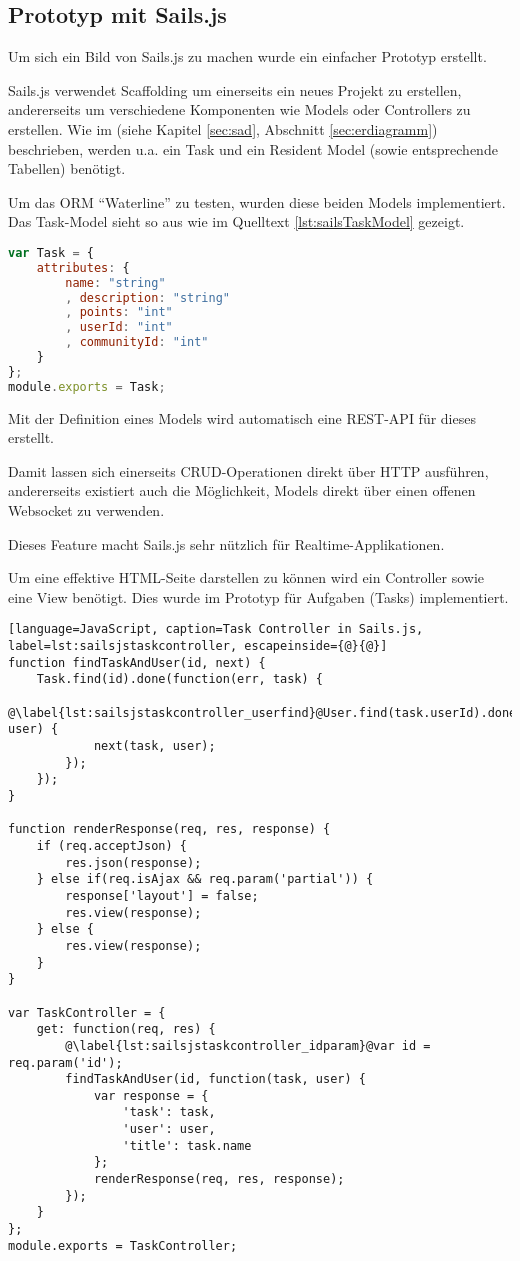 \subsection{Prototyp mit Sails.js}
Um sich ein Bild von Sails.js zu machen wurde ein einfacher Prototyp \cite{SailsPrototyp} erstellt.

Sails.js verwendet \gls{Scaffolding} um einerseits ein neues Projekt zu erstellen, andererseits  um verschiedene Komponenten wie Models oder Controllers zu erstellen. Wie im  (siehe Kapitel \ref{sec:sad}, Abschnitt \ref{sec:erdiagramm}) beschrieben, werden u.a. ein Task und ein Resident Model (sowie entsprechende Tabellen) benötigt.

Um das \gls{ORM} ``Waterline'' \cite{Waterline} zu testen, wurden diese beiden Models implementiert. Das Task-Model sieht so aus wie im Quelltext \ref{lst:sailsTaskModel} gezeigt.

\begin{lstlisting}[language=JavaScript, caption=Task Model in Sails.js, label=lst:sailsTaskModel]
var Task = {
	attributes: {
		name: "string"
		, description: "string"
		, points: "int"
		, userId: "int"
		, communityId: "int"
	}
};
module.exports = Task;
\end{lstlisting}

Mit der Definition eines Models wird automatisch eine \gls{REST}-API für dieses erstellt.

Damit lassen sich einerseits CRUD-Operationen direkt über HTTP ausführen, andererseits existiert auch die Möglichkeit, Models direkt über einen offenen \gls{Websocket} zu verwenden.

Dieses Feature macht Sails.js sehr nützlich für \gls{Realtime}-Applikationen.

Um eine effektive HTML-Seite darstellen zu können wird ein Controller sowie eine View benötigt. Dies wurde im Prototyp für Aufgaben (Tasks) implementiert.

\newpage
\begin{lstlisting}[language=JavaScript, caption=Task Controller in Sails.js, label=lst:sailsjstaskcontroller, escapeinside={@}{@}]
function findTaskAndUser(id, next) {
	Task.find(id).done(function(err, task) {
		@\label{lst:sailsjstaskcontroller_userfind}@User.find(task.userId).done(function(err, user) {
			next(task, user);
		});
	});
}

function renderResponse(req, res, response) {
	if (req.acceptJson) {
		res.json(response);
	} else if(req.isAjax && req.param('partial')) {
		response['layout'] = false;
		res.view(response);
	} else {
		res.view(response);
	}
}

var TaskController = {
	get: function(req, res) {
		@\label{lst:sailsjstaskcontroller_idparam}@var id = req.param('id');
		findTaskAndUser(id, function(task, user) {
			var response = {
				'task': task,
				'user': user,
				'title': task.name
			};
			renderResponse(req, res, response);
		});
	}
};
module.exports = TaskController;
\end{lstlisting}

